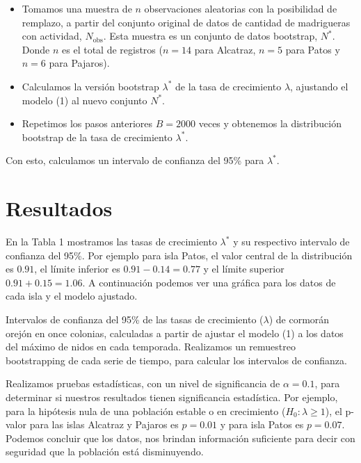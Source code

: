 \documentclass{article} %
\begin{document}
\begin{itemize}
    \item Tomamos una muestra de $n$ observaciones aleatorias con la posibilidad de remplazo, a partir del conjunto original de datos de cantidad de madrigueras con actividad, $ N_{\mbox{obs}} $. Esta muestra es un conjunto de datos bootstrap, $N^{*}$. Donde $n$ es el total de registros ($n=14$ para Alcatraz, $n=5$ para Patos y $n=6$ para Pajaros).
    \item Calculamos la versión bootstrap $\lambda^*$ de la tasa de crecimiento $\lambda$, ajustando el modelo (1) al nuevo conjunto $N^{*}$.
    \item Repetimos los pasos anteriores $B = 2000$ veces y obtenemos la distribución bootstrap de la tasa de crecimiento $\lambda^*$.
\end{itemize}

Con esto, calculamos un intervalo de confianza del 95\% para $ \lambda^* $. 

\section*{Resultados}

En la Tabla 1 mostramos las tasas de crecimiento $\lambda^*$ y su respectivo intervalo de confianza del 95\%. Por ejemplo para isla Patos, el valor central de la distribución es $0.91$, el límite inferior es $0.91 - 0.14 = 0.77$ y el límite superior $ 0.91 + 0.15 = 1.06$. A continuación podemos ver una gráfica para los datos de cada isla y el modelo ajustado.

\begin{table}[H]
\centering
\caption{Intervalos de confianza del 95\% de las tasas de crecimiento ($\lambda$) de cormorán orejón en once colonias, calculadas a partir de ajustar el modelo (1) a los datos del máximo de nidos en cada temporada. Realizamos un remuestreo bootstrapping de cada serie de tiempo, para calcular los intervalos de confianza.}
\label{tab:csvTodasLambdas}
\end{table}

Realizamos pruebas estadísticas, con un nivel de significancia de $\alpha = 0.1$, para determinar si nuestros resultados tienen significancia estadística. Por ejemplo, para la hipótesis nula de una población estable o en crecimiento ($H_0: \lambda\geq 1$), el p-valor para las islas Alcatraz y Pajaros es $p=0.01$ y para isla Patos es $p=0.07$. Podemos concluir que los datos, nos brindan información suficiente para decir con seguridad que la población está disminuyendo.
\end{document}
